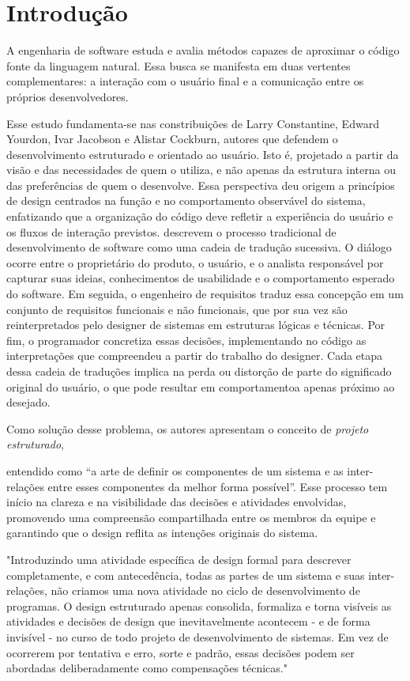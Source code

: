 \documentclass[12pt,a4paper]{article}
\begin{document}
\section{Introdução}

A engenharia de software estuda e avalia métodos capazes de aproximar o código fonte da linguagem natural. Essa busca se manifesta em duas vertentes complementares: a interação com o usuário final e a comunicação entre os próprios desenvolvedores.

Esse estudo fundamenta-se nas constribuições de Larry Constantine, Edward Yourdon, Ivar Jacobson e Alistar Cockburn, autores que defendem o desenvolvimento estruturado e orientado ao usuário. Isto é, projetado a partir da visão e das necessidades de quem o utiliza, e não apenas da estrutura interna ou das preferências de quem o desenvolve. Essa perspectiva deu origem a princípios de design centrados na função e no comportamento observável do sistema, enfatizando que a organização do código deve refletir a experiência do usuário e os fluxos de interação previstos. \textcite{yourdon1979structured} descrevem o processo tradicional de desenvolvimento de software como uma cadeia de tradução sucessiva. O diálogo ocorre entre o proprietário do produto, o usuário, e o analista responsável por capturar suas ideias, conhecimentos de usabilidade e o comportamento esperado do software. Em seguida, o engenheiro de requisitos traduz essa concepção em um conjunto de requisitos funcionais e não funcionais, que por sua vez são reinterpretados pelo designer de sistemas em estruturas lógicas e técnicas. Por fim, o programador concretiza essas decisões, implementando no código as interpretações que compreendeu a partir do trabalho do designer. Cada etapa dessa cadeia de traduções implica na perda ou distorção de parte do significado original do usuário, o que pode resultar em comportamentoa apenas próximo ao desejado.

Como solução desse problema, os autores apresentam o conceito de \textit{projeto estruturado}, %

entendido como “a arte de definir os componentes de um sistema e as inter-relações entre esses componentes da melhor forma possível”\textcite{yourdon1979structured}. Esse processo tem início na clareza e na visibilidade das decisões e atividades envolvidas, promovendo uma compreensão compartilhada entre os membros da equipe e garantindo que o design reflita as intenções originais do sistema.

"Introduzindo uma atividade específica de design formal para descrever completamente, e com antecedência, todas as partes de um sistema e suas inter-relações, não criamos uma nova atividade no ciclo de desenvolvimento de programas. O design estruturado apenas consolida, formaliza e torna visíveis as atividades e decisões de design que inevitavelmente acontecem - e de forma invisível - no curso de todo projeto de desenvolvimento de sistemas. Em vez de ocorrerem por tentativa e erro, sorte e padrão, essas decisões podem ser abordadas deliberadamente como compensações técnicas."
\end{document}
